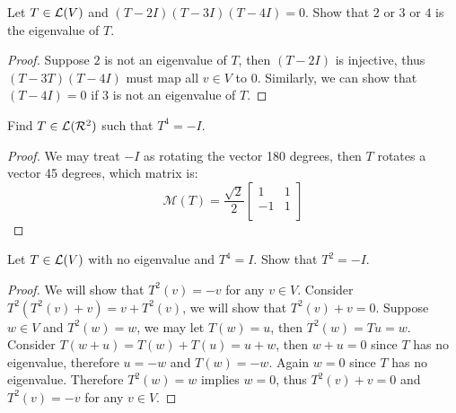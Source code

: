 \documentclass[../main.tex]{subfiles}
\begin{document}
\setcounter{exercise}{29}
\begin{exercise}
  Let $T \in \mathcal{L}(V)$ and $(T - 2I)(T - 3I)(T - 4I) = 0$.
  Show that $2$ or $3$ or $4$ is the eigenvalue of $T$.
\end{exercise}
\begin{proof}
  Suppose $2$ is not an eigenvalue of $T$, then $(T - 2I)$ is injective,
  thus $(T - 3T)(T - 4I)$ must map all $v \in V$ to $0$.
  Similarly, we can show that $(T - 4I) = 0$ if $3$ is not an eigenvalue of $T$.
\end{proof}

\begin{exercise}
  Find $T \in \mathcal{L}(\mathcal{R}^2)$ such that $T^4 = -I$.
\end{exercise}
\begin{proof}
  We may treat $-I$ as rotating the vector 180 degrees, then $T$
  rotates a vector 45 degrees, which matrix is:
  \[
  \mathcal{M}(T) =
  \frac{\sqrt{2}}{2}
  \begin{bmatrix}
     1 & 1 \\
    -1 & 1 \\
  \end{bmatrix}
  \]
\end{proof}

\begin{exercise}
  Let $T \in \mathcal{L}(V)$ with no eigenvalue and $T^4 = I$.
  Show that $T^2 = - I$.
\end{exercise}
\begin{proof}
  

  We will show that $T^2(v) = -v$ for any $v \in V$.
  Consider $T^2(T^2(v) + v) = v + T^2(v)$, we will show that $T^2(v) + v = 0$.
  Suppose $w \in V$ and $T^2(w) = w$, we may let $T(w) = u$, then
  $T^2(w) = Tu = w$. Consider $T(w + u) = T(w) + T(u) = u + w$,
  then $w + u = 0$ since $T$ has no eigenvalue,
  therefore $u = -w$ and $T(w) = -w$. Again $w = 0$ since $T$ has no eigenvalue.
  Therefore $T^2(w) = w$ implies $w = 0$, thus $T^2(v) + v = 0$
  and $T^2(v) = -v$ for any $v \in V$.
\end{proof}
\end{document}
